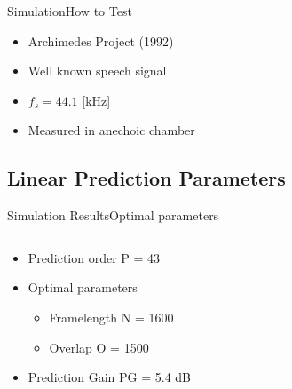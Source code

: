 \begin{frame}{Simulation}{How to Test}	
\begin{itemize}
	\item Archimedes Project (1992)
	\item Well known speech signal
	\item $f_s = 44.1$ [kHz] 
	\item Measured in anechoic chamber		
\end{itemize}
\end{frame}




\subsection{Linear Prediction Parameters}
\begin{frame}{Simulation Results}{Optimal parameters}		
\begin{columns}
	\begin{column}{0.4\textwidth}
		\begin{itemize}
			\item Prediction order P = 43
			\item Optimal parameters
			\begin{itemize}
				\item Framelength N = 1600
				\item Overlap O = 1500
			\end{itemize}
			\item Prediction Gain PG = 5.4 dB
		\end{itemize}
	\end{column}
	\begin{column}{0.6\textwidth} 
		\resizebox{0.9\columnwidth}{!}{		
			}
	\end{column}
\end{columns}
\end{frame}

